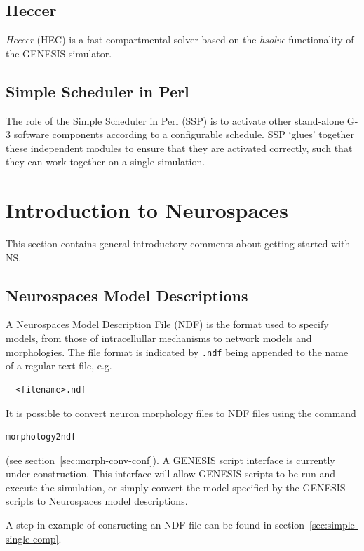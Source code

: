 \documentclass[12pt]{article}
\begin{document}
\subsection{Heccer}

{\it Heccer} (HEC) is a fast compartmental solver based on the {\it
  hsolve} functionality of the GENESIS simulator.

\subsection{Simple Scheduler in Perl}

The role of the Simple Scheduler in Perl (SSP) is to activate other
stand-alone G-3 software components according to a configurable
schedule. SSP `glues' together these independent modules to ensure
that they are activated correctly, such that they can work together on
a single simulation.
 
\section{Introduction to Neurospaces}

This section contains general introductory comments about getting
started with NS.

\subsection{Neurospaces Model Descriptions}

A Neurospaces Model Description File (NDF) is the format used to
specify models, from those of intracellullar mechanisms to network
models and morphologies.  The file format is indicated by {\tt .ndf}
being appended to the name of a regular text file, e.g.
\begin{verbatim}
  <filename>.ndf
\end{verbatim}

It is possible to convert neuron morphology files to NDF files
using the command
\begin{verbatim}
morphology2ndf
\end{verbatim}
(see section~\ref{sec:morph-conv-conf}).  A GENESIS script interface is
currently under construction.  This interface will allow 
GENESIS scripts to be run and execute the simulation, or simply convert the
model specified by the GENESIS scripts to Neurospaces model
descriptions.

A step-in example of consructing an NDF file can
be found in section~\ref{sec:simple-single-comp}.
\end{document}
